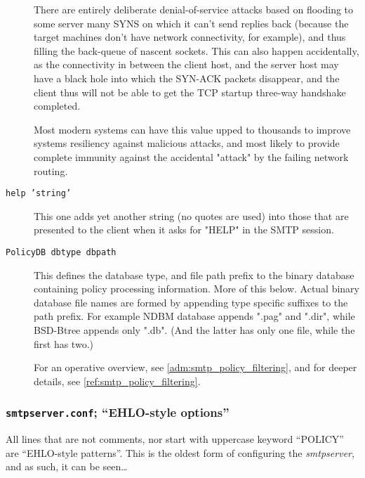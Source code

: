 \begin{description}
There are entirely deliberate denial-of-service attacks based on
flooding to some server many SYNS on which it can't send replies
back (because the target machines don't have network connectivity,
for example), and thus filling the back-queue of nascent sockets.
This can also happen accidentally, as the connectivity in between
the client host, and the server host may have a black hole into
which the SYN-ACK packets disappear, and the client thus will not
be able to get the TCP startup three-way handshake completed.

Most modern systems can have this value upped to thousands to
improve systems resiliency against malicious attacks, and most
likely to provide complete immunity against the accidental
"attack" by the failing network routing.



\item[{\tt help 'string'}] \mbox{}

This one adds yet another string (no quotes are used) into those
that are presented to the client when it asks for "HELP" in the
SMTP session.



\item[{\tt PolicyDB dbtype dbpath}] \mbox{}

This defines the database type, and file path prefix to the binary
database containing policy processing information.  More of this
below.  Actual binary database file names are formed by appending
type specific suffixes to the path prefix.  For example NDBM
database appends ".pag" and ".dir", while BSD-Btree appends only
".db".  (And the latter has only one file, while the first has two.)

For an operative overview, see  \vref{adm:smtp_policy_filtering}, and
for deeper details, see \vref{ref:smtp_policy_filtering}.

\end{description}


\subsubsection{{\tt smtpserver.conf}; ``EHLO-style options''}
\label{adm:smtpserver:ehlostyle}

All lines that are not comments, nor start with uppercase keyword
``POLICY'' are ``EHLO-style patterns''.
This is the oldest form of configuring the {\em smtpserver}, and
as such, it can be seen\ldots



